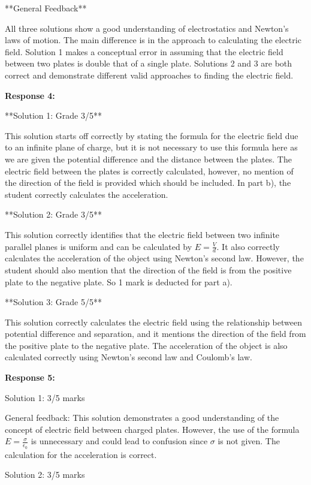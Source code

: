 \documentclass[a4paper,11pt]{article}
\begin{document}
**General Feedback**

All three solutions show a good understanding of electrostatics and Newton's laws of motion. The main difference is in the approach to calculating the electric field. Solution 1 makes a conceptual error in assuming that the electric field between two plates is double that of a single plate. Solutions 2 and 3 are both correct and demonstrate different valid approaches to finding the electric field.

\textbf{Response 4:}

**Solution 1: Grade 3/5**

This solution starts off correctly by stating the formula for the electric field due to an infinite plane of charge, but it is not necessary to use this formula here as we are given the potential difference and the distance between the plates. The electric field between the plates is correctly calculated, however, no mention of the direction of the field is provided which should be included. In part b), the student correctly calculates the acceleration. 


**Solution 2: Grade 3/5**

This solution correctly identifies that the electric field between two infinite parallel planes is uniform and can be calculated by \( E = \frac{V}{d} \). It also correctly calculates the acceleration of the object using Newton's second law. However, the student should also mention that the direction of the field is from the positive plate to the negative plate. So 1 mark is deducted for part a).

**Solution 3: Grade 5/5**

This solution correctly calculates the electric field using the relationship between potential difference and separation, and it mentions the direction of the field from the positive plate to the negative plate. The acceleration of the object is also calculated correctly using Newton's second law and Coulomb's law.


\textbf{Response 5:}

Solution 1: 3/5 marks

General feedback: This solution demonstrates a good understanding of the concept of electric field between charged plates. However, the use of the formula \( E = \frac{\sigma}{\epsilon_0} \) is unnecessary and could lead to confusion since \( \sigma \) is not given. The calculation for the acceleration is correct.

Solution 2: 3/5 marks
\end{document}
